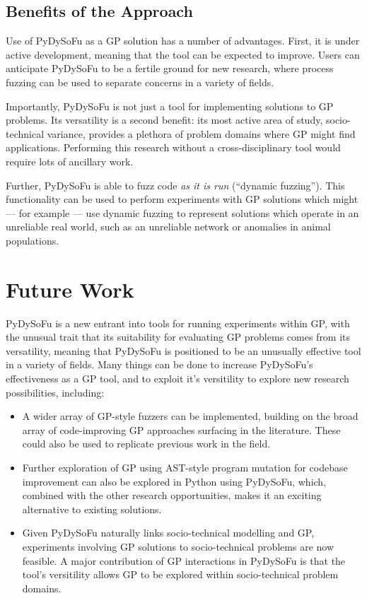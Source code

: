 \documentclass[draft,12pt]{llncs} %
\begin{document}
\subsection{Benefits of the Approach}
Use of PyDySoFu as a GP solution has a number of advantages. First, it is under
active development, meaning that the tool can be expected to improve. Users can
anticipate PyDySoFu to be a fertile ground for new research, where process
fuzzing can be used to separate concerns in a variety of fields.\par

Importantly, PyDySoFu is not just a tool for implementing solutions to GP
problems. Its versatility is a second benefit: its most active area of study,
socio-technical variance, provides a plethora of problem domains where GP might
find applications. Performing this research without a cross-disciplinary tool
would require lots of ancillary work.\par

Further, PyDySoFu is able to fuzz code \emph{as it is run} (``dynamic
fuzzing''). This functionality can be used to perform experiments with GP
solutions which might --- for example --- use dynamic fuzzing to represent
solutions which operate in an unreliable real world, such as an unreliable
network or anomalies in animal populations.\par


\section{Future Work}
\label{sec:future_work}
PyDySoFu is a new entrant into tools for running experiments within GP, with the
unusual trait that its suitability for evaluating GP problems comes from its
versatility, meaning that PyDySoFu is positioned to be an unusually effective
tool in a variety of fields. Many things can be done to increase PyDySoFu's
effectiveness as a GP tool, and to exploit it's versitility to explore new
research possibilities, including:

\begin{itemize}

\item A wider array of GP-style fuzzers can be implemented, building on the
  broad array of code-improving GP approaches surfacing in the literature.
  These could also be used to replicate previous work in the field.
  
\item Further exploration of GP using AST-style program mutation for codebase
  improvement can also be explored in Python using PyDySoFu, which, combined
  with the other research opportunities, makes it an exciting alternative to
  existing solutions.

\item Given PyDySoFu naturally links socio-technical modelling and GP,
  experiments involving GP solutions to socio-technical problems are now
  feasible. A major contribution of GP interactions in PyDySoFu is that the
  tool's versitility allows GP to be explored within socio-technical problem
  domains\cite{wallis2018a}.

\end{itemize}
\end{document}
